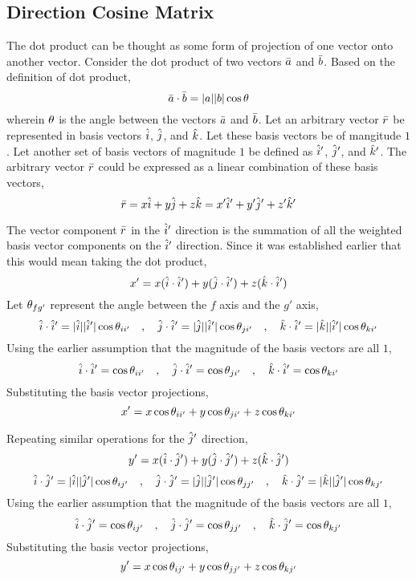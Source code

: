 \documentclass[class=report, 12pt, crop=false]{standalone}
\begin{document}
\begin{center}
\section{Direction Cosine Matrix}
\begin{comment}
\end{comment}
The dot product can be thought as some form of projection of one vector onto another vector. Consider the dot product of two vectors $\bar{a}$ and $\bar{b}$. Based on the definition of dot product,
$$\bar{a}\cdot\bar{b} = |a||b|\cos\theta$$
wherein $\theta$ is the angle between the vectors $\bar{a}$ and $\bar{b}$. Let an arbitrary vector $\bar{r}$ be represented in basis vectors $\hat{i}$, $\hat{j}$, and $\hat{k}$. Let these basis vectors be of mangitude $1$. Let another set of basis vectors of magnitude $1$ be defined as $\hat{i}'$, $\hat{j}'$, and $\hat{k}'$. The arbitrary vector $\bar{r}$ could be expressed as a linear combination of these basis vectors,
$$\bar{r} = x\hat{i} + y\hat{j} + z\hat{k} = x'\hat{i}' + y'\hat{j}' + z'\hat{k}'$$

The vector component $\bar{r}$ in the $\hat{i}'$ direction is the summation of all the weighted basis vector components on the $\hat{i}'$ direction. Since it was established earlier that this would mean taking the dot product,
$$x' = x(\hat{i}\cdot\hat{i}') + y(\hat{j}\cdot\hat{i}') + z(\hat{k}\cdot\hat{i}')$$
Let $\theta_{fg'}$ represent the angle between the $f$ axis and the $g'$ axis,
$$\hat{i}\cdot\hat{i}' = |\hat{i}||\hat{i}'|\cos\theta_{ii'} \quad,\quad \hat{j}\cdot\hat{i}' = |\hat{j}||\hat{i}'|\cos\theta_{ji'} \quad,\quad \hat{k}\cdot\hat{i}' = |\hat{k}||\hat{i}'|\cos\theta_{ki'}$$
Using the earlier assumption that the magnitude of the basis vectors are all $1$,
$$\hat{i}\cdot\hat{i}' = \cos\theta_{ii'} \quad,\quad \hat{j}\cdot\hat{i}' = \cos\theta_{ji'} \quad,\quad \hat{k}\cdot\hat{i}' = \cos\theta_{ki'}$$
Substituting the basis vector projections,
$$x' = x\cos\theta_{ii'} + y\cos\theta_{ji'} + z\cos\theta_{ki'}$$

Repeating similar operations for the $\hat{j}'$ direction,
$$y' = x(\hat{i}\cdot\hat{j}') + y(\hat{j}\cdot\hat{j}') + z(\hat{k}\cdot\hat{j}')$$
$$\hat{i}\cdot\hat{j}' = |\hat{i}||\hat{j}'|\cos\theta_{ij'} \quad,\quad \hat{j}\cdot\hat{j}' = |\hat{j}||\hat{j}'|\cos\theta_{jj'} \quad,\quad \hat{k}\cdot\hat{j}' = |\hat{k}||\hat{j}'|\cos\theta_{kj'}$$
Using the earlier assumption that the magnitude of the basis vectors are all $1$,
$$\hat{i}\cdot\hat{j}' = \cos\theta_{ij'} \quad,\quad \hat{j}\cdot\hat{j}' = \cos\theta_{jj'} \quad,\quad \hat{k}\cdot\hat{j}' = \cos\theta_{kj'}$$
Substituting the basis vector projections,
$$y' = x\cos\theta_{ij'} + y\cos\theta_{jj'} + z\cos\theta_{kj'}$$


\end{center}
\end{document}
